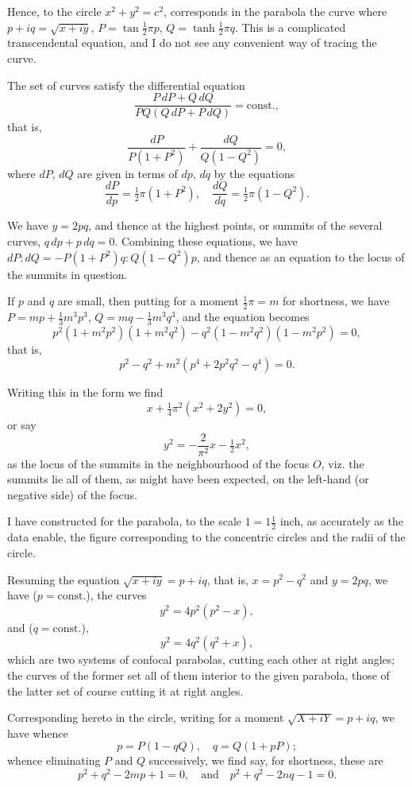 \documentclass[11pt,a4paper]{article}
\theoremstyle{definition}
\begin{document}
Hence, to the circle $x^2 + y^2 = c^2$, corresponds in the parabola the curve where $p + iq = \sqrt{x+iy}$, $P = \tan \frac{1}{2}\pi p$, $Q = \tanh \frac{1}{2}\pi q$. This is a complicated transcendental equation, and I do not see any convenient way of tracing the curve.

The set of curves satisfy the differential equation
\[
\frac{P\,dP + Q\,dQ}{PQ(Q\,dP + P\,dQ)} = \text{const.},
\]
that is,
\[
\frac{dP}{P(1+P^2)} + \frac{dQ}{Q(1-Q^2)} = 0,
\]
where $dP$, $dQ$ are given in terms of $dp$, $dq$ by the equations
\[
\frac{dP}{dp} = \tfrac{1}{2}\pi(1+P^2), \quad \frac{dQ}{dq} = \tfrac{1}{2}\pi(1-Q^2).
\]

We have $y = 2pq$, and thence at the highest points, or summits of the several curves, $q\,dp + p\,dq = 0$. Combining these equations, we have $dP : dQ = -P(1+P^2)q : Q(1-Q^2)p$, and thence as an equation to the locus of the summits in question.

If $p$ and $q$ are small, then putting for a moment $\frac{1}{2}\pi = m$ for shortness, we have $P = mp + \frac{1}{3}m^3p^3$, $Q = mq - \frac{1}{3}m^3q^3$, and the equation becomes
\[
p^2(1 + m^2p^2)(1 + m^2q^2) - q^2(1 - m^2q^2)(1 - m^2p^2) = 0,
\]
that is,
\[
p^2 - q^2 + m^2(p^4 + 2p^2q^2 - q^4) = 0.
\]

Writing this in the form we find
\[
x + \tfrac{1}{4}\pi^2(x^2 + 2y^2) = 0,
\]
or say
\[
y^2 = -\frac{2}{\pi^2}x - \tfrac{1}{2}x^2,
\]
as the locus of the summits in the neighbourhood of the focus $O$, viz. the summits lie all of them, as might have been expected, on the left-hand (or negative side) of the focus.

I have constructed for the parabola, to the scale $1 = 1\frac{1}{2}$ inch, as accurately as the data enable, the figure corresponding to the concentric circles and the radii of the circle.

Resuming the equation $\sqrt{x+iy} = p + iq$, that is, $x = p^2 - q^2$ and $y = 2pq$, we have ($p = \text{const.}$), the curves
\[
y^2 = 4p^2(p^2 - x),
\]
and ($q = \text{const.}$),
\[
y^2 = 4q^2(q^2 + x),
\]
which are two systems of confocal parabolas, cutting each other at right angles; the curves of the former set all of them interior to the given parabola, those of the latter set of course cutting it at right angles.

Corresponding hereto in the circle, writing for a moment $\sqrt{X+iY} = p + iq$, we have whence
\[
p = P(1 - qQ), \quad q = Q(1 + pP);
\]
whence eliminating $P$ and $Q$ successively, we find say, for shortness, these are
\[
p^2 + q^2 - 2mp + 1 = 0, \quad \text{and} \quad p^2 + q^2 - 2nq - 1 = 0.
\]
\end{document}
